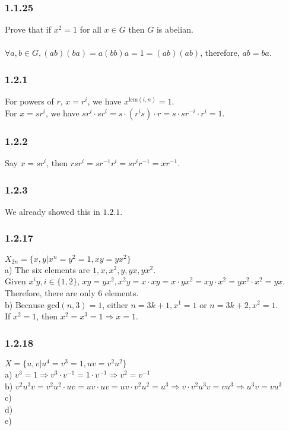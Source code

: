 \documentclass{article}
\begin{document}
\subsubsection{1.1.25}
Prove that if $x^2=1$ for all $x \in G$ then $G$ is abelian.\\\\
$\forall a, b \in G, (ab)(ba)=a(bb)a=1=(ab)(ab)$, therefore, $ab = ba$.\\

\subsubsection{1.2.1}
For powers of $r$, $x = r^i$, we have $x^{\textrm{lcm}(i, n)} = 1$.\\
For $x = sr^i$, we have $sr^i \cdot sr^i = s \cdot (r^is) \cdot r = s \cdot sr^{-i} \cdot r^i = 1$.
\subsubsection{1.2.2}
Say $x = sr^i$, then $rsr^i = sr^{-1}r^i = sr^i r^{-1} = xr^{-1}$.
\subsubsection{1.2.3}
We already showed this in $1.2.1$.
\subsubsection{1.2.17}
$X_{2n} = \{x,y|x^n = y^2 = 1, xy = yx^2\}$\\
a) The six elements are $1, x, x^2, y, yx, yx^2$.\\
Given $x^iy, i\in \{1,2\}$, $xy=yx^2, x^2y = x \cdot xy = x \cdot yx^2 = xy \cdot x^2 = yx^2 \cdot x^2 = yx$.\\
Therefore, there are only $6$ elements.\\
b) Because $\textrm{gcd}(n, 3) = 1$, either $n = 3k+1, x^1 = 1$ or $n = 3k+2, x^2 = 1$.\\
If $x^2 = 1$, then $x^2 = x^3 = 1 \Rightarrow x = 1$.
\subsubsection{1.2.18}
$X = \{u,v|u^4=v^3=1, uv=v^2u^2\}$\\
a) $v^3 = 1 \Rightarrow v^3 \cdot v^{-1} = 1 \cdot v^{-1} \Rightarrow v^2 = v^{-1}$\\
b) $v^2u^3v = v^2u^2 \cdot uv = uv \cdot uv = uv \cdot v^2u^2 = u^3 \Rightarrow v \cdot v^2u^3v = vu^3 \Rightarrow u^3v = vu^3$\\
c)\\
d)\\
e)
\end{document}
